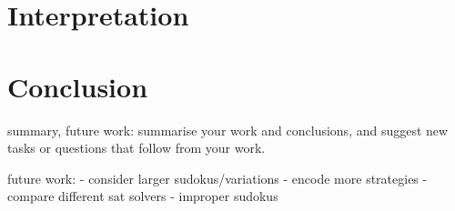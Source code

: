 \documentclass[10pt,a4paper,leqno]{article}
\begin{document}
 

\section*{Interpretation}



\section*{Conclusion} summary, future work: summarise your work and conclusions, and suggest new tasks or questions that follow from your work. 


future work:
- consider larger sudokus/variations
- encode more strategies
- compare different sat solvers
- improper sudokus
\end{document}
